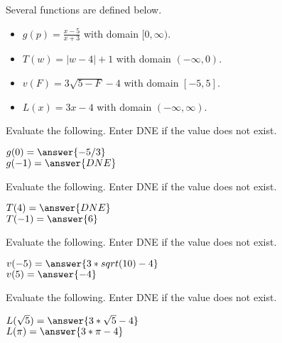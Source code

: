 \documentclass{ximera}
\begin{document}
\begin{definition}
Several functions are defined below.
\begin{itemize}
\item $g(p) = \frac{x-5}{x+3}$ with domain $[0, \infty)$. \\ \quad
\item $T(w) = | w - 4 | + 1$ with domain $(-\infty, 0)$. 
\item $v(F) = 3\sqrt{5 - F} - 4$ with domain $[-5, 5]$. 
\item $L(x) = 3x - 4$ with domain $(-\infty, \infty)$. 
\end{itemize}
\end{definition}



\begin{exercise}
Evaluate the following.  Enter DNE if the value does not exist.

$g(0) = \answer{-5/3}$  \\
$g(-1) = \answer{DNE}$

\end{exercise}




\begin{exercise}
Evaluate the following.  Enter DNE if the value does not exist.

$T(4) = \answer{DNE}$  \\
$T(-1) = \answer{6}$

\end{exercise}




\begin{exercise}
Evaluate the following.  Enter DNE if the value does not exist.

$v(-5) = \answer{3 * sqrt(10) - 4}$  \\
$v(5) = \answer{-4}$

\end{exercise}



\begin{exercise}
Evaluate the following.  Enter DNE if the value does not exist.

$L(\sqrt{5}) = \answer{3 * \sqrt{5} - 4}$  \\
$L(\pi) = \answer{3 * \pi - 4}$

\end{exercise}
\end{document}
